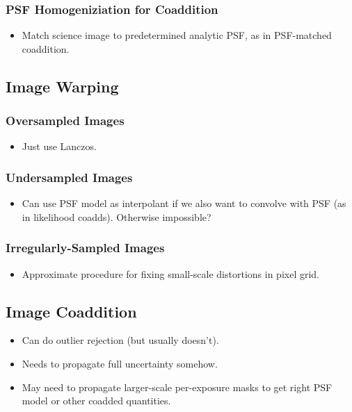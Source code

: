 \subsubsection{PSF Homogeniziation for Coaddition}
\begin{itemize}
\item Match science image to predetermined analytic PSF, as in PSF-matched coaddition.
\end{itemize}

\subsection{Image Warping}
\subsubsection{Oversampled Images}
\begin{itemize}
\item Just use Lanczos.
\end{itemize}
\subsubsection{Undersampled Images}
\begin{itemize}
\item Can use PSF model as interpolant if we also want to convolve with PSF (as in likelihood coadds).  Otherwise impossible?
\end{itemize}
\subsubsection{Irregularly-Sampled Images}
\begin{itemize}
\item Approximate procedure for fixing small-scale distortions in pixel grid.
\end{itemize}

\subsection{Image Coaddition}
\begin{itemize}
\item Can do outlier rejection (but usually doesn't).
\item Needs to propagate full uncertainty somehow.
\item May need to propagate larger-scale per-exposure masks to get right PSF model or other coadded quantities.
\end{itemize}

